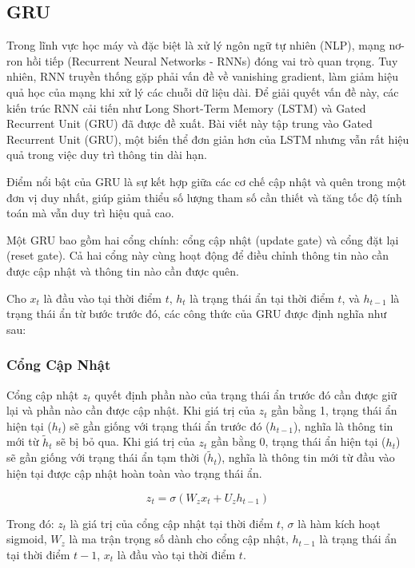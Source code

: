 \subsection{GRU}

Trong lĩnh vực học máy và đặc biệt là xử lý ngôn ngữ tự nhiên (NLP), mạng nơ-ron hồi tiếp (Recurrent Neural Networks - RNNs) đóng vai trò quan trọng. Tuy nhiên, RNN truyền thống gặp phải vấn đề về vanishing gradient, làm giảm hiệu quả học của mạng khi xử lý các chuỗi dữ liệu dài. Để giải quyết vấn đề này, các kiến trúc RNN cải tiến như Long Short-Term Memory (LSTM) và Gated Recurrent Unit (GRU) đã được đề xuất. Bài viết này tập trung vào Gated Recurrent Unit (GRU), một biến thể đơn giản hơn của LSTM nhưng vẫn rất hiệu quả trong việc duy trì thông tin dài hạn.

Điểm nổi bật của GRU là sự kết hợp giữa các cơ chế cập nhật và quên trong một đơn vị duy nhất, giúp giảm thiểu số lượng tham số cần thiết và tăng tốc độ tính toán mà vẫn duy trì hiệu quả cao.

Một GRU bao gồm hai cổng chính: cổng cập nhật (update gate) và cổng đặt lại (reset gate). Cả hai cổng này cùng hoạt động để điều chỉnh thông tin nào cần được cập nhật và thông tin nào cần được quên.

Cho \( x_t \) là đầu vào tại thời điểm \( t \), \( h_t \) là trạng thái ẩn tại thời điểm \( t \), và \( h_{t-1} \) là trạng thái ẩn từ bước trước đó, các công thức của GRU được định nghĩa như sau:

\subsubsection{Cổng Cập Nhật}

Cổng cập nhật \( z_t \) quyết định phần nào của trạng thái ẩn trước đó cần được giữ lại và phần nào cần được cập nhật. Khi giá trị của \( z_t \) gần bằng 1, trạng thái ẩn hiện tại (\( h_t \)) sẽ gần giống với trạng thái ẩn trước đó (\( h_{t-1} \)), nghĩa là thông tin mới từ \( \tilde{h}_t \) sẽ bị bỏ qua. Khi giá trị của \( z_t \) gần bằng 0, trạng thái ẩn hiện tại (\( h_t \)) sẽ gần giống với trạng thái ẩn tạm thời (\( \tilde{h}_t \)), nghĩa là thông tin mới từ đầu vào hiện tại được cập nhật hoàn toàn vào trạng thái ẩn.

\[
z_t = \sigma(W_z x_t + U_z h_{t-1})
\]

Trong đó: \( z_t \) là giá trị của cổng cập nhật tại thời điểm \( t \), \( \sigma \) là hàm kích hoạt sigmoid, \( W_z \) là ma trận trọng số dành cho cổng cập nhật, \( h_{t-1} \) là trạng thái ẩn tại thời điểm \( t-1 \), \( x_t \) là đầu vào tại thời điểm \( t \).

